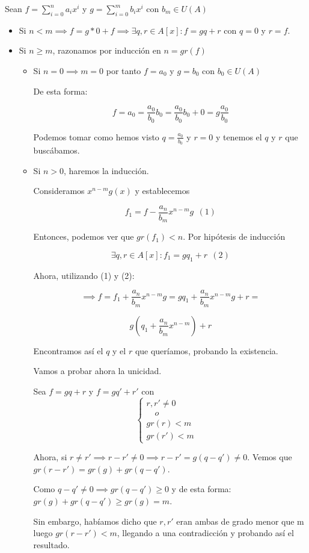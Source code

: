 \documentclass[11pt, a4paper, titlepage]{article}
\makeatletter
\newif\IfInSansMode
\let\oldsf\sffamily
\renewcommand*{\sffamily}{\oldsf\mathversion{sans}\InSansModetrue}
\let\oldnorm\normalfont
\renewcommand*{\normalfont}{\oldnorm\InSansModefalse\mathversion{normal}}
\renewenvironment{proof}[1][\proofname] {\vspace{-15pt}\par\pushQED{\qed}\normalfont\topsep6\p@\@plus6\p@\relax\trivlist\item[\hskip\labelsep\it#1\@addpunct{.}]\ignorespaces}{\popQED\endtrivlist\@endpefalse}
\renewenvironment{proof}[1][\proofname] {\par\pushQED{\qed}\normalfont\topsep6\p@\@plus6\p@\relax\trivlist\item[\hskip\labelsep\itshape\sffamily#1\@addpunct{.}]\ignorespaces}{\popQED\endtrivlist\@endpefalse}
\theoremstyle{theorem-style}
\theoremstyle{definition-style}
\theoremstyle{remark-style}
\theoremstyle{example-style}
\makeatother
\begin{document}
\begin{proof}

	Sean $f = \sum_{i=0}^n a_i x^i$ y $g = \sum_{i=0}^m b_i x^i$ con $b_m \in U(A)$

	\begin{itemize}

	\item Si $n< m \implies f = g * 0 + f \implies \exists q,r\in A[x] : f = gq+r$ con $q=0$ y $r = f$.

	\item Si $n\geq m$, razonamos por inducción en $n=gr(f)$
	\begin{itemize}

	\item Si $n=0 \implies m = 0$ por tanto $f=a_0$ y $g=b_0$ con $b_0 \in U(A)$

	De esta forma:

	\[
	f = a_0 = \frac{a_0}{b_0}b_0 = \frac{a_0}{b_0}b_0 + 0 = g\frac{a_0}{b_0}
	\]

	Podemos tomar como hemos visto $q=\frac{a_0}{b_0}$ y $r=0$ y tenemos el $q$ y $r$ que buscábamos.

	\item Si $n> 0$, haremos la inducción.

	  Consideramos $x^{n-m}g(x)$ y establecemos

          $$f_1 = f - \frac{a_n}{b_m}x^{n-m}g\ \ (1)$$

	  Entonces, podemos ver que $gr(f_1) < n$. Por hipótesis de inducción

          $$ \exists q,r \in A[x] : f_1 = gq_1 + r \ \ (2)$$

	Ahora, utilizando (1) y (2):

	 \[
	 \implies f = f_1 +\frac{a_n}{b_m}x^{n-m}g = gq_1 + \frac{a_n}{b_m}x^{n-m}g +r =
	 \]

	 \[
	 g\left(q_1 + \frac{a_n}{b_m}x^{n-m}\right) + r
	 \]

	Encontramos así el $q$ y el $r$ que queríamos, probando la existencia.

	Vamos a probar ahora la unicidad.

	Sea $f=gq+r$ y $f= gq' +r'$ con
	\[
    \begin{cases}
		 r,r' \neq 0\\
		  \quad o \\
 gr(r) < m
 \\ gr(r') < m

\end{cases}
	\quad
	\]

	Ahora, si $r\neq r'\implies r-r' \neq 0 \implies r-r' = g(q-q') \neq 0$.
	Vemos que $gr(r-r') = gr(g)+ gr(q-q')$.

 Como $q-q' \neq 0 \implies gr(q-q') \geq 0 $ y de esta forma: $gr(g)+ gr(q-q') \geq gr(g) = m$.

 Sin embargo, habíamos dicho que $r,r'$ eran ambas de grado menor que m luego $gr(r-r') < m$, llegando a una contradicción y probando así el resultado.
\end{itemize}


\end{itemize}
\end{proof}
\end{document}
